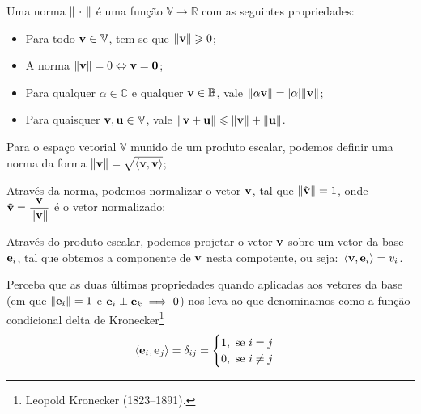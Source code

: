 \begin{definition}
\label{def: norm}
    Uma norma $\norm{\ \cdot\ }$ é uma função $\mathbb{V}\to\mathbb{R}$ com as seguintes propriedades:
    \begin{itemize}
        \item Para todo $\vb{v}\in\mathbb{V}$, tem-se que $\norm{\vb{v}} \geqslant 0$;
        \item A norma $\norm{\vb{v}} = 0 \Leftrightarrow \vb{v} = \vb{0}$;
        \item Para qualquer $\alpha\in\mathbb{C}$ e qualquer $\vb{v}\in\mathbb{B}$, vale $\norm{\alpha \vb{v}} = \abs{\alpha} \norm{\vb{v}}$;
        \item Para quaisquer $\vb{v},\vb{u}\in\mathbb{V}$, vale $\norm{\vb{v}+\vb{u}} \leqslant \norm{\vb{v}} + \norm{\vb{u}}$.
    \end{itemize}
\end{definition}

\begin{myitemize}
    \item Para o espaço vetorial $\mathbb{V}$ munido de um produto escalar, podemos definir uma norma da forma $\norm{\vb{v}} = \sqrt{\expval{\vb{v},\vb{v}}}$;

    \item Através da norma, podemos normalizar o vetor $\vb{v}$, tal que $\norm{\tilde{\vb{v}}} = 1$, onde $\tilde{\vb{v}} = \dfrac{\vb{v}}{\norm{\vb{v}}}$ é o vetor normalizado;

    \item Através do produto escalar, podemos projetar o vetor $\vb{v}$ sobre um vetor da base $\vb{e}_{i}$, tal que obtemos a componente de $\vb{v}$ nesta compotente, ou seja: $\expval*{\vb{v},\vb{e}_{i}} = v_{i}$.
\end{myitemize}
Perceba que as duas últimas propriedades quando aplicadas aos vetores da base (em que $\norm{\vb{e}_i} = 1$ e $\vb{e}_{i} \perp \vb{e}_{k} \implies 0$) nos leva ao que denominamos como a função condicional delta de Kronecker\footnote{Leopold Kronecker (1823--1891).}
\begin{equation*}
    \langle \vb{e}_i, \vb{e}_j \rangle = \delta_{ij} = \begin{cases}
        1,\ \textrm{se} \ i = j\\ 
        0, \ \textrm{se} \ i \neq j
    \end{cases}
\end{equation*}

